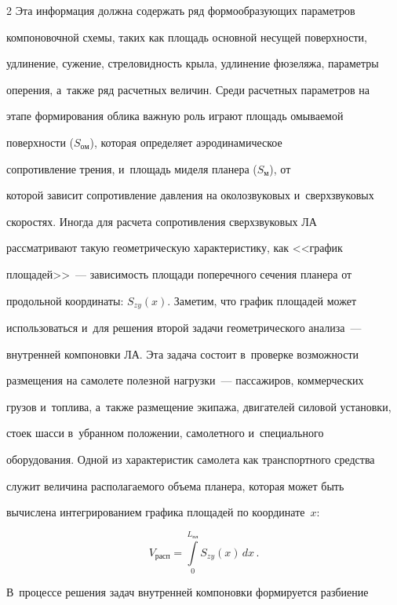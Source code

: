 \begin{multicols}{2}
Эта информация должна содержать ряд фор\-мо\-об\-ра\-зу\-ющих па\-ра\-мет\-ров 


компоновочной схемы, таких как площадь основной несущей по\-верх\-ности, 


удлинение, сужение, стреловидность крыла, удлинение фюзеляжа, па\-ра\-мет\-ры 


оперения, а~так\-же ряд расчетных величин. Среди расчетных па\-ра\-мет\-ров на 


этапе формирования облика важную роль играют площадь омываемой 


по\-верх\-ности ($S_{\mathrm{ом}}$), которая определяет аэродинамическое 


сопротивление трения, и~площадь миделя планера ($S_{\mathrm{м}}$), от 


которой зависит сопротивление дав\-ле\-ния на околозвуковых и~сверхзвуковых 


скоростях. Иногда для расчета сопротивления сверхзвуковых ЛА 


рассматривают такую гео\-мет\-ри\-че\-скую характеристику, как <<график 


площадей>>~--- за\-ви\-си\-мость площади поперечного сечения планера от 


продольной координаты: $S_{zy}(x)$. Заметим, что график площадей может 


использоваться и~для решения второй задачи гео\-мет\-ри\-че\-ско\-го анализа~--- 


внутренней компоновки ЛА. Эта задача состоит в~проверке воз\-мож\-ности 


размещения на самолете полезной нагрузки~--- пассажиров, коммерческих 


грузов и~топлива, а~так\-же размещение экипажа, двигателей силовой установки, 


стоек шасси в~убранном положении, самолетного и~специального 


оборудования. Одной из характеристик самолета как транспортного средства 


служит величина располагаемого объема планера, которая может быть 


вы\-чис\-ле\-на интегрированием графика площадей по координате~$x$: 


$$


V_{\mathrm{расп}}= \int\limits_0^{L_{\mathrm{пл}}} S_{zy}(x)\,dx\,.


$$ 


В~процессе решения задач внутренней компоновки формируется разбиение 



\end{multicols}

